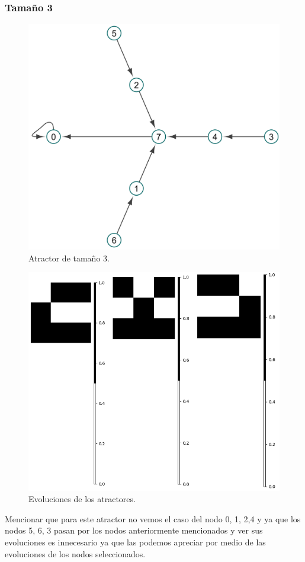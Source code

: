 \documentclass[11pt]{article}
\begin{document}
			\subsubsection{Tamaño 3}
			\begin{figure}[H]
			\centering
			\includegraphics[scale=0.08]{resources/Atractores54/atractor_54_size_3.png}
			\caption{Atractor de tamaño 3.}\label{fig:picture}
			\end{figure}
			\begin{figure}[H]
			\centering
			\includegraphics[scale=0.4]{resources/Atractores54/atractor_54_size_3_res.png}
			\caption{Evoluciones de los atractores.}\label{fig:picture}
			\end{figure}
			Mencionar que para este atractor no vemos el caso del nodo 0, 1, 2,4 y ya que los nodos 5, 6, 3 pasan por los nodos anteriormente mencionados y ver sus evoluciones es innecesario ya que las podemos apreciar por medio de las evoluciones de los nodos seleccionados.
			
\end{document}
